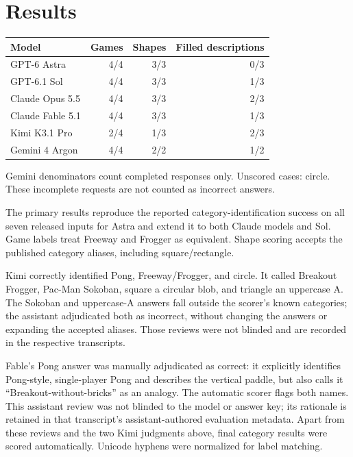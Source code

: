 \documentclass[11pt]{article}
\begin{document}
\section*{Results}
\begin{center}
\begin{tabular}{lrrr}
Model & Games & Shapes & Filled descriptions\\
\hline
GPT-6 Astra & 4/4 & 3/3 & 0/3\\
GPT-6.1 Sol & 4/4 & 3/3 & 1/3\\
Claude Opus 5.5 & 4/4 & 3/3 & 2/3\\
Claude Fable 5.1 & 4/4 & 3/3 & 1/3\\
Kimi K3.1 Pro & 2/4 & 1/3 & 2/3\\
Gemini 4 Argon & 4/4 & 2/2 & 1/2\\
\end{tabular}
\end{center}

Gemini denominators count completed responses only. Unscored cases: circle. These incomplete requests are not counted as incorrect answers.

The primary results reproduce the reported category-identification success on
all seven released inputs for Astra and extend it to both Claude models and Sol.
Game labels treat Freeway and Frogger as equivalent. Shape scoring accepts the
published category aliases, including square/rectangle.

Kimi correctly identified Pong, Freeway/Frogger, and circle. It called Breakout
Frogger, Pac-Man Sokoban, square a circular blob, and triangle an uppercase A.
The Sokoban and uppercase-A answers fall outside the scorer's known categories;
the assistant adjudicated both as incorrect, without changing the answers or
expanding the accepted aliases. Those reviews were not blinded and are recorded
in the respective transcripts.

Fable's Pong answer was manually adjudicated as correct: it explicitly identifies
Pong-style, single-player Pong and describes the vertical paddle, but also calls
it ``Breakout-without-bricks'' as an analogy. The automatic scorer flags both
names. This assistant review was not blinded to the model or answer key; its
rationale is retained in that transcript's assistant-authored evaluation metadata. Apart from these reviews and the two Kimi judgments above, final category
results were scored automatically. Unicode hyphens were normalized for label
matching.
\end{document}
